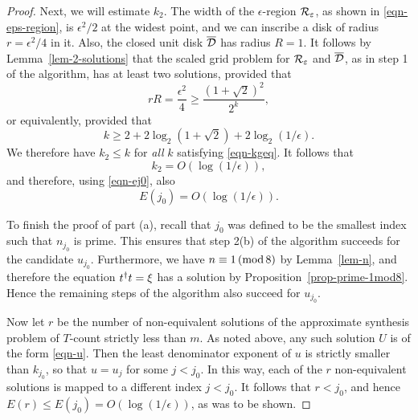 \documentclass{article}
\begin{document}
\begin{proof}
  Next, we will estimate $k_2$.  The width of the $\epsilon$-region
  ${\cal R}_{\varepsilon}$, as shown in {\eqref{eqn-eps-region}}, is
  $\epsilon^2/2$ at the widest point, and we can inscribe a disk of
  radius $r={\epsilon^2}/{4}$ in it. Also, the closed unit disk
  $\overline {\cal D}$ has radius $R=1$. It follows by Lemma~\ref{lem-2-solutions}
  that the scaled grid problem for ${\cal R}_{\varepsilon}$ and $\overline {\cal D}$, as in step
  1 of the algorithm, has at least two solutions, provided that
  \begin{equation}\label{eqn-rR}
    rR = \frac{\epsilon^2}{4} \geq \frac{(1+\sqrt2)^2}{2^k},
  \end{equation}
  or equivalently, provided that
  \begin{equation}\label{eqn-kgeq}
    k\geq 2 + 2 \log_2(1+\sqrt2) + 2\log_2 ({1}/{\epsilon}).
  \end{equation}
  We therefore have $k_2\leq k$ for {\em all} $k$ satisfying
  {\eqref{eqn-kgeq}}. It follows that
  \begin{equation}\label{eqn-k2}
    k_2=O(\log({1}/{\epsilon})),
  \end{equation}
  and therefore, using {\eqref{eqn-ej0}}, also
  \begin{equation}\label{eqn-ej0-eps}
    E(j_0)=O(\log({1}/{\epsilon})).
  \end{equation}
  
  To finish the proof of part (a), recall that $j_0$ was defined to be
  the smallest index such that $n_{j_0}$ is prime. This ensures that
  step 2(b) of the algorithm succeeds for the candidate $u_{j_0}$.
  Furthermore, we have $n\equiv 1\,(\mathop{{\rm mod}}8)$ by Lemma~\ref{lem-n}, and
  therefore the equation $t^{\dagger} t=\xi$ has a solution by
  Proposition~\ref{prop-prime-1mod8}. Hence the remaining steps of the
  algorithm also succeed for $u_{j_0}$.

  Now let $r$ be the number of non-equivalent solutions of the
  approximate synthesis problem of $T$-count strictly less than
  $m$. As noted above, any such solution $U$ is of the form
  {\eqref{eqn-u}}. Then the least denominator exponent of $u$ is
  strictly smaller than $k_{j_0}$, so that $u=u_j$ for some
  $j<j_0$. In this way, each of the $r$ non-equivalent solutions is
  mapped to a different index $j<j_0$. It follows that $r<j_0$, and
  hence $E(r)\leq E(j_0)=O(\log({1}/{\epsilon}))$, as was to be shown.


\end{proof}
\end{document}
